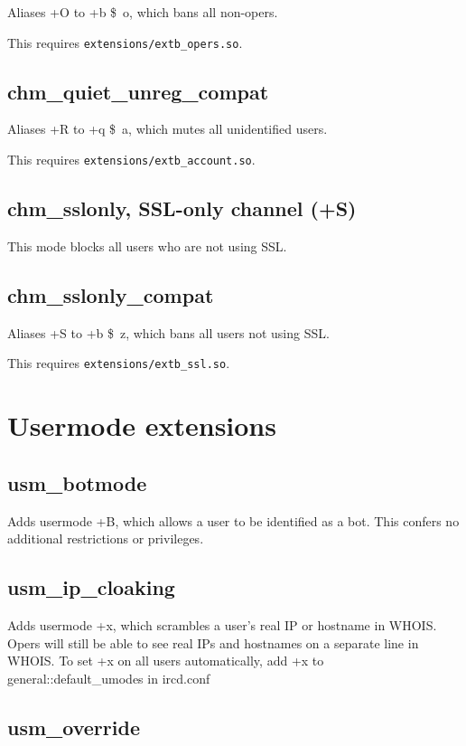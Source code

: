 	Aliases +O to +b \$~o, which bans all non-opers.

	This requires \nolinkurl{extensions/extb\_opers.so}.

\subsection{chm\_quiet\_unreg\_compat}

	Aliases +R to +q \$~a, which mutes all unidentified users.

	This requires \nolinkurl{extensions/extb\_account.so}.

\subsection{chm\_sslonly, SSL-only channel (+S)}

	This mode blocks all users who are not using SSL.

\subsection{chm\_sslonly\_compat}

	Aliases +S to +b \$~z, which bans all users not using SSL.

	This requires \nolinkurl{extensions/extb\_ssl.so}.


\section{Usermode extensions}
\label{umodeextensions}

\subsection{usm\_botmode}

	Adds usermode +B, which allows a user to be identified as a bot.
	This confers no additional restrictions or privileges.

\subsection{usm\_ip\_cloaking}

	Adds usermode +x, which scrambles a user's real IP or hostname in WHOIS.
	Opers will still be able to see real IPs and hostnames on a separate line in
	WHOIS. To set +x on all users automatically, add +x to general::default\_umodes in
	ircd.conf

\subsection{usm\_override}

